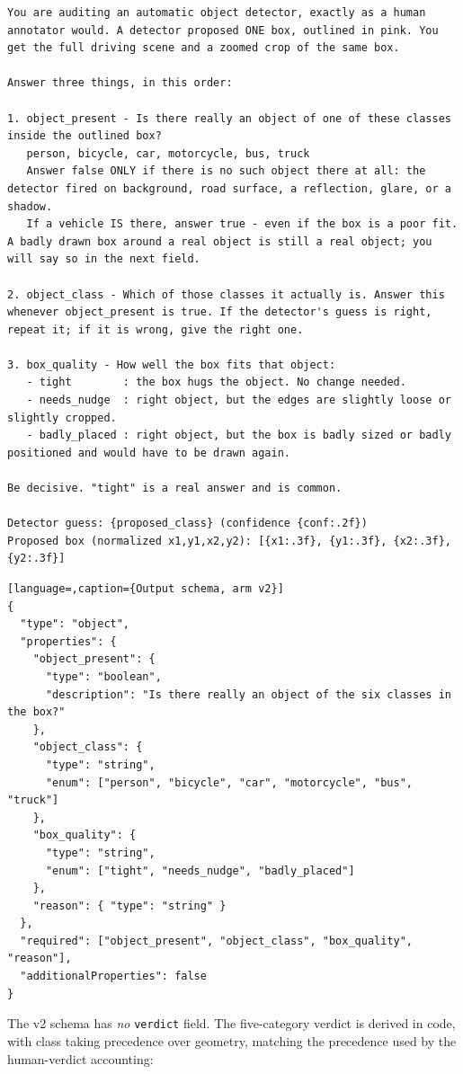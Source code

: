 \begin{lstlisting}
You are auditing an automatic object detector, exactly as a human annotator would. A detector proposed ONE box, outlined in pink. You get the full driving scene and a zoomed crop of the same box.

Answer three things, in this order:

1. object_present - Is there really an object of one of these classes inside the outlined box?
   person, bicycle, car, motorcycle, bus, truck
   Answer false ONLY if there is no such object there at all: the detector fired on background, road surface, a reflection, glare, or a shadow.
   If a vehicle IS there, answer true - even if the box is a poor fit. A badly drawn box around a real object is still a real object; you will say so in the next field.

2. object_class - Which of those classes it actually is. Answer this whenever object_present is true. If the detector's guess is right, repeat it; if it is wrong, give the right one.

3. box_quality - How well the box fits that object:
   - tight        : the box hugs the object. No change needed.
   - needs_nudge  : right object, but the edges are slightly loose or slightly cropped.
   - badly_placed : right object, but the box is badly sized or badly positioned and would have to be drawn again.

Be decisive. "tight" is a real answer and is common.

Detector guess: {proposed_class} (confidence {conf:.2f})
Proposed box (normalized x1,y1,x2,y2): [{x1:.3f}, {y1:.3f}, {x2:.3f}, {y2:.3f}]
\end{lstlisting}

\begin{lstlisting}[language=,caption={Output schema, arm v2}]
{
  "type": "object",
  "properties": {
    "object_present": {
      "type": "boolean",
      "description": "Is there really an object of the six classes in the box?"
    },
    "object_class": {
      "type": "string",
      "enum": ["person", "bicycle", "car", "motorcycle", "bus", "truck"]
    },
    "box_quality": {
      "type": "string",
      "enum": ["tight", "needs_nudge", "badly_placed"]
    },
    "reason": { "type": "string" }
  },
  "required": ["object_present", "object_class", "box_quality", "reason"],
  "additionalProperties": false
}
\end{lstlisting}

\noindent
The v2 schema has \emph{no} \texttt{verdict} field. The five-category verdict is
derived in code, with class taking precedence over geometry, matching the
precedence used by the human-verdict accounting:

